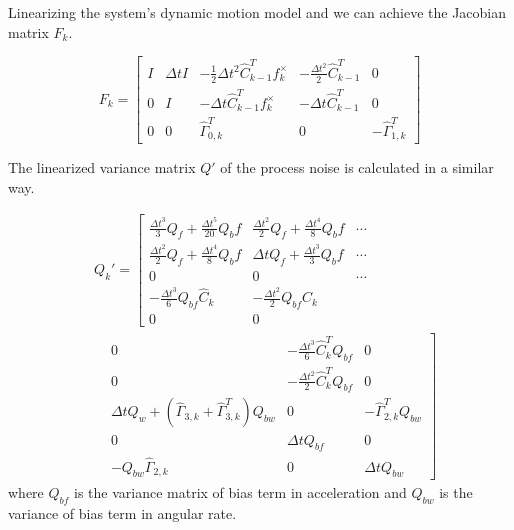 \documentclass[letterpaper, 10 pt, conference]{ieeeconf}  %
\begin{document}
Linearizing the system's dynamic motion model and we can achieve the Jacobian matrix $F_k$. 

\begin{equation}
\renewcommand\arraystretch{1.7}
F_k=\begin{bmatrix}
 I   & \Delta tI & -\frac{1}{2} \Delta t^2 \hat{C}_{k-1}^T f_k^{\times}  & -\frac{\Delta t^2}{2}\hat{C}_{k-1}^T &0 \\
 0   & I         & -\Delta t \hat{C}_{k-1}^T f_k^{\times}  &-\Delta t \hat{C}_{k-1}^T     &0 \\
 0   & 0         & \hat{\Gamma}^T_{0,k} & 0            & -\hat{\Gamma}^T_{1,k}
\end{bmatrix}
\end{equation}

The linearized variance matrix $Q'$ of the process noise is calculated in a similar way.

\begin{equation}
\renewcommand\arraystretch{1.7}
\begin{aligned}
&Q_k' =\left[ \begin{matrix}
\frac{\Delta t^3}{3} Q_f + \frac{\Delta t^5}{20} Q_bf    & \frac{\Delta t^2}{2} Q_f + \frac{\Delta t^4}{8} Q_bf    &\cdots \\

\frac{\Delta t^2}{2} Q_f + \frac{\Delta t^4}{8} Q_bf   & \Delta t Q_f + \frac{\Delta t^3}{3} Q_bf         & \cdots     \\
0                           &  0  & \cdots     \\   

-\frac{\Delta t^3}{6} Q_{bf} \hat{C}_k  &-\frac{\Delta t^2}{2} Q_{bf} \hat{C}_k       \\
0  &0  
\end{matrix} \right.  \\
&
\left.\begin{matrix}  
 &0   &-\frac{\Delta t^3}{6} \hat{C}_k^T Q_{bf}  &0   \\
 &0   &-\frac{\Delta t^2}{2} \hat{C}_k^T Q_{bf}  &0   \\
 & \Delta t Q_w +(\hat{\Gamma}_{3,k}+\hat{\Gamma}_{3,k}^T) Q_{bw} &0 &-\hat{\Gamma}_{2,k}^T Q_{bw}   \\
&0       &\Delta t Q_{bf}   &0    \\
&-Q_{bw}\hat{\Gamma}_{2,k}  &0    &\Delta t Q_{bw} 
 \end{matrix}\right]
 \end{aligned}
\end{equation}
where $Q_{bf}$ is the variance matrix of bias term in acceleration and $Q_{bw}$ is the variance of bias term in angular rate.
\end{document}

